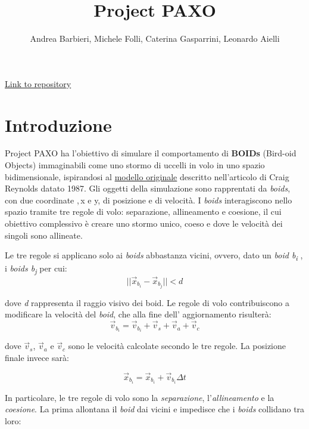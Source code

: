 \documentclass{article}
\title{\textbf{Project PAXO}}
\author{Andrea Barbieri, Michele Folli, Caterina Gasparrini, Leonardo Aielli}
\begin{document}
\maketitle
\begin{center}
\href{https://github.com/Michelefolli/Progettopaxxo}{Link to repository}
    
\end{center}

\section{Introduzione}
\label{intro}

Project PAXO ha l'obiettivo di simulare il comportamento di \textbf{BOIDs} 
(Bird-oid Objects) immaginabili come uno stormo di uccelli in volo in uno spazio
 bidimensionale, ispirandosi al \href{https://en.wikipedia.org/wiki/Boids}
 {modello originale} descritto nell'articolo di Craig Reynolds datato 1987. Gli 
 oggetti della simulazione sono rapprentati da \textit{boids}, con due 
 coordinate ,\,x e y, di posizione e di velocità. I \textit{boids} interagiscono
  nello spazio tramite tre regole di volo: separazione, allineamento e coesione,
il cui obiettivo complessivo è creare uno stormo unico, coeso e dove le velocità
 dei singoli sono allineate.

Le tre regole si applicano solo ai \textit{boids} abbastanza vicini, ovvero, 
dato un \textit{boid b\textsubscript{i}} , i \textit{boids b\textsubscript{j}} 
per cui:
\smallskip
\[
 ||\vec{x}_{b_i} - \vec{x}_{b_j}|| < d 
\]

\medskip

dove \textit{d} rappresenta il raggio visivo dei boid. Le regole di volo
 contribuiscono a modificare la velocità del \textit{boid}, che alla fine dell'
 aggiornamento risulterà:
\smallskip
\[
\vec{v}_{b_i} = \vec{v}_{b_i} + \vec{v}_s + \vec{v}_a + \vec{v}_c
\]

\medskip

dove \(\vec{v}_s\), \(\vec{v}_a\) e \(\vec{v}_c\) sono le velocità calcolate 
secondo le tre regole. La posizione finale invece sarà:

\smallskip
\[
\vec{x}_{b_i} = \vec{x}_{b_i} + \vec{v}_{b_i} \Delta t
\]

\smallskip

In particolare, le tre regole di volo sono la \textit{separazione}, l'\textit
{allineamento} e la \textit{coesione}. La prima allontana il \textit{boid} dai 
vicini e impedisce che i \textit{boids} collidano tra loro:
\end{document}
